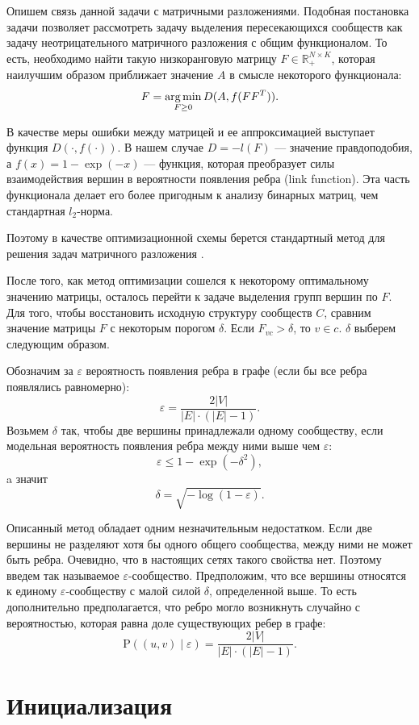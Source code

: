 \documentclass{ITaSconf}
\newcommand{\argmin}{\mathop{\rm arg\,min}\limits}
\def\PP{\mathrm{P}}
\begin{document}
	Опишем связь данной задачи с матричными разложениями.
	Подобная постановка задачи позволяет рассмотреть задачу выделения пересекающихся сообществ как задачу неотрицательного матричного разложения с общим функционалом.
	То есть, необходимо найти такую низкоранговую матрицу $F\in \mathbb{R}_{+}^{N \times K}$, которая наилучшим образом приближает значение $A$ в смысле некоторого функционала:
	$$ F = \argmin_{F\ge 0} D(A, f(F F^T)). $$
	
	В качестве меры ошибки между матрицей и ее аппроксимацией выступает функция $D(\cdot, f(\cdot))$. В нашем случае
	$D = -l(F)$ --- значение правдоподобия, а $f(x) = 1 - \exp(-x)$ --- функция, которая преобразует силы взаимодействия вершин в вероятности появления ребра (link function). Эта часть функционала делает его более пригодным к анализу бинарных матриц, чем стандартная $l_2$-норма.
	
	Поэтому в качестве оптимизационной схемы берется стандартный метод для решения задач матричного разложения \cite{lin2007projected}.
	
	После того, как метод оптимизации сошелся к некоторому оптимальному значению матрицы, осталось перейти к задаче выделения групп вершин по $F$.
	Для того, чтобы восстановить исходную структуру сообществ $C$, сравним значение матрицы $F$ с некоторым порогом $\delta$. Если $F_{vc} > \delta$, то $v \in c$. $\delta$ выберем следующим образом.
	
	Обозначим за $\varepsilon$ вероятность появления ребра в графе (если бы все ребра появлялись равномерно): 
	$$\varepsilon = \dfrac{2|V|}{|E|\cdot (|E|-1)}.$$ 
	Возьмем $\delta$ так, чтобы две вершины принадлежали одному сообществу, если модельная вероятность появления ребра между ними выше чем $\varepsilon$:
	$$\varepsilon \le 1-\exp(-\delta^2),$$
	a значит
	$$\delta = \sqrt{-\log(1-\varepsilon)}. $$
	
	Описанный метод обладает одним незначительным недостатком.
	Если две вершины не разделяют хотя бы одного общего сообщества, между ними не может быть ребра.
	Очевидно, что в настоящих сетях такого свойства нет.
	Поэтому введем так называемое $\varepsilon$-сообщество.
	Предположим, что все вершины относятся к единому $\varepsilon$-сообществу с малой силой $\delta$, определенной выше.
	То есть дополнительно предполагается, что ребро могло возникнуть случайно с вероятностью, которая равна доле существующих ребер в графе:
	$$ \PP((u,v)\mid \varepsilon) = \dfrac{2|V|}{|E| \cdot \left( |E| - 1 \right)}.$$
	
	\section{Инициализация}
	
\end{document}
